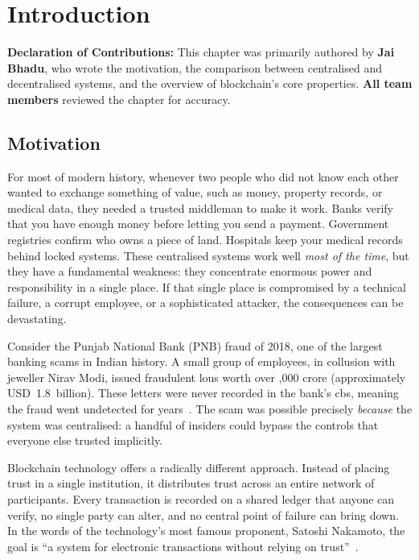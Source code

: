 \chapter{Introduction}
\label{ch:intro}

\noindent\textbf{Declaration of Contributions:} This chapter was primarily authored by \textbf{Jai Bhadu}, who wrote the motivation, the comparison between centralised and decentralised systems, and the overview of blockchain's core properties. \textbf{All team members} reviewed the chapter for accuracy.

\section{Motivation}

For most of modern history, whenever two people who did not know each other wanted to exchange something of value, such as money, property records, or medical data, they needed a trusted middleman to make it work. Banks verify that you have enough money before letting you send a payment. Government registries confirm who owns a piece of land. Hospitals keep your medical records behind locked systems.  These centralised systems work well \emph{most of the time}, but they have a fundamental weakness: they concentrate enormous power and responsibility in a single place. If that single place is compromised by a technical failure, a corrupt employee, or a sophisticated attacker, the consequences can be devastating.

Consider the Punjab National Bank (PNB) fraud of 2018, one of the largest banking scams in Indian history. A small group of employees, in collusion with jeweller Nirav Modi, issued fraudulent \glspl{lou} worth over ,000 crore (approximately USD~1.8~billion). These letters were never recorded in the bank's \gls{cbs}, meaning the fraud went undetected for years~\cite{web:apptunix}. The scam was possible precisely \emph{because} the system was centralised: a handful of insiders could bypass the controls that everyone else trusted implicitly.

Blockchain technology offers a radically different approach. Instead of placing trust in a single institution, it distributes trust across an entire network of participants. Every transaction is recorded on a shared ledger that anyone can verify, no single party can alter, and no central point of failure can bring down. In the words of the technology's most famous proponent, Satoshi Nakamoto, the goal is ``a system for electronic transactions without relying on trust''~\cite{nakamoto2008bitcoin}.

